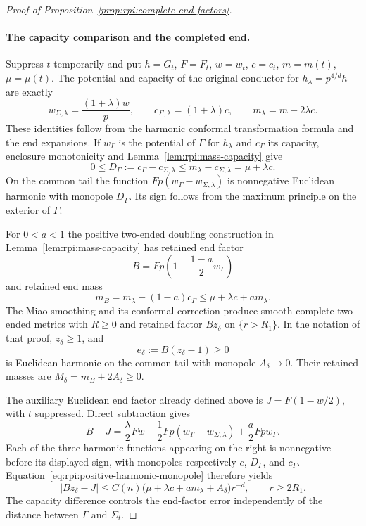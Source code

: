 \begin{proof}[Proof of Proposition~\ref{prop:rpi:complete-end-factors}]
\paragraph{The capacity comparison and the completed end.}
Suppress $t$ temporarily and put $h=G_t$, $F=F_t$, $w=w_t$, $c=c_t$,
$m=m(t)$, $\mu=\mu(t)$.  The potential and capacity of the original
conductor for $h_\lambda=p^{4/d}h$ are exactly
\begin{equation}\label{eq:rpi:perturbed-capacity-exact}
 w_{\Sigma,\lambda}=\frac{(1+\lambda)w}{p},\qquad
 c_{\Sigma,\lambda}=(1+\lambda)c,\qquad
 m_\lambda=m+2\lambda c.
\end{equation}
These identities follow from the harmonic conformal transformation
formula and the end expansions.  If $w_\Gamma$ is the potential of
$\Gamma$ for $h_\lambda$ and $c_\Gamma$ its capacity, enclosure
monotonicity and Lemma~\ref{lem:rpi:mass-capacity} give
\[
 0\le D_\Gamma:=c_\Gamma-c_{\Sigma,\lambda}
 \le m_\lambda-c_{\Sigma,\lambda}=\mu+\lambda c.
\]
On the common tail the function
$Fp(w_\Gamma-w_{\Sigma,\lambda})$ is nonnegative Euclidean harmonic
with monopole $D_\Gamma$.  Its sign follows from the maximum
principle on the exterior of $\Gamma$.

For $0<a<1$ the positive two-ended doubling construction in
Lemma~\ref{lem:rpi:mass-capacity} has retained end factor
\[
 B=Fp\left(1-\frac{1-a}{2}w_\Gamma\right)
\]
and retained end mass
\[
 m_B=m_\lambda-(1-a)c_\Gamma
 \le \mu+\lambda c+a m_\lambda .
\]
The Miao smoothing and its conformal correction produce smooth
complete two-ended metrics with $R\ge0$ and retained factor $Bz_\delta$
on $\{r>R_1\}$.  In the notation of that proof,
$z_\delta\ge1$, and
\[
 e_\delta:=B(z_\delta-1)\ge0
\]
is Euclidean harmonic on the common tail with monopole
$A_\delta\to0$.  Their retained masses are
$M_\delta=m_B+2A_\delta\ge0$.

The auxiliary Euclidean end factor already defined above is
$J=F(1-w/2)$, with $t$ suppressed. Direct subtraction gives
\[
 B-J=
 \frac{\lambda}{2}Fw
 -\frac12Fp(w_\Gamma-w_{\Sigma,\lambda})
 +\frac a2Fp w_\Gamma .
\]
Each of the three harmonic functions appearing on the right is
nonnegative before its displayed sign, with monopoles respectively
$c$, $D_\Gamma$, and $c_\Gamma$.
Equation~\eqref{eq:rpi:positive-harmonic-monopole} therefore yields
\begin{equation}\label{eq:rpi:completed-factor-comparison}
 |Bz_\delta-J|
 \le C(n)\bigl(\mu+\lambda c+a m_\lambda+A_\delta\bigr)r^{-d},
 \qquad r\ge2R_1 .
\end{equation}
The capacity difference controls the end-factor error independently
of the distance between $\Gamma$ and $\Sigma_t$.


\end{proof}
